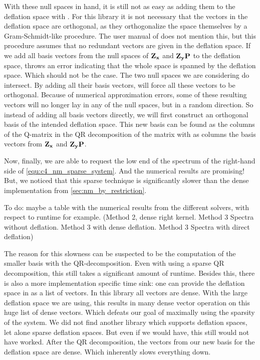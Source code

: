 With these null spaces in hand, it is still not as easy as adding them to the deflation space with \slepc. For this library it is not necessary that the vectors in the deflation space are orthogonal, as they orthogonalize the space themselves by a Gram-Schmidt-like procedure. The user manual of \slepc does not mention this, but this procedure assumes that no redundant vectors are given in the deflation space. If we add all basis vectors from the null spaces of $\vb{Z_x}$ and $\vb{Z_y}\vb{P}$ to the deflation space, \slepc throws an error indicating that the whole space is spanned by the deflation space. Which should not be the case. The two null spaces we are considering do intersect. By adding all their basis vectors, \slepc will force all these vectors to be orthogonal. Because of numerical approximation errors, some of these resulting vectors will no longer lay in any of the null spaces, but in a random direction. So instead of adding all basis vectors directly, we will first construct an orthogonal basis of the intended deflation space. This new basis can be found as the columns of the Q-matrix in the QR decomposition of the matrix with as columns the basis vectors from $\vb{Z_x}$ and $\vb{Z_y} \vb{P}$.

Now, finally, we are able to request the low end of the spectrum of the right-hand side of \eqref{equ:c4_nm_sparse_system}. And the numerical results are promising! But, we noticed that this sparse technique is significantly slower than the dense implementation from \ref{sec:nm_by_restriction}.

{\color{red} To do: maybe a table with the numerical results from the different solvers, with respect to runtime for example. (Method 2, dense right kernel. Method 3 Spectra without deflation. Method 3 \slepc with dense deflation. Method 3 Spectra with direct deflation)}

The reason for this slowness can be suspected to be the computation of the smaller basis with the QR-decomposition. Even with using a sparse QR decomposition, this still takes a significant amount of runtime. Besides this, there is also a more implementation specific time sink: one can provide the deflation space in \slepc as a list of vectors. In this library all vectors are dense. With the large deflation space we are using, this results in many dense vector operation on this huge list of dense vectors. Which defeats our goal of maximally using the sparsity of the system. We did not find another library which supports deflation spaces, let alone sparse deflation spaces. But even if we would have, this still would not have worked. After the QR decomposition, the vectors from our new basis for the deflation space are dense. Which inherently slows everything down.

